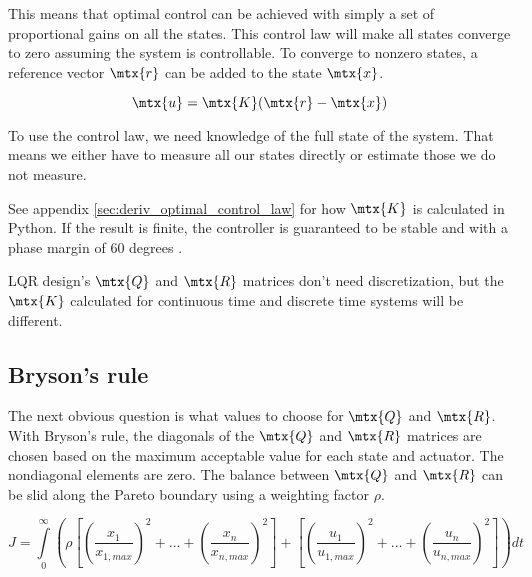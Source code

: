 This means that optimal control can be achieved with simply a set of
proportional gains on all the \glspl{state}. This \gls{control law} will make
all \glspl{state} converge to zero assuming the \gls{system} is controllable. To
converge to nonzero \glspl{state}, a \gls{reference} vector $\mtx{r}$ can be
added to the \gls{state} $\mtx{x}$.

\begin{theorem}
  \begin{equation}
    \mtx{u} = \mtx{K}(\mtx{r} - \mtx{x})
  \end{equation}
\end{theorem}

To use the \gls{control law}, we need knowledge of the full \gls{state} of the
\gls{system}. That means we either have to measure all our \glspl{state}
directly or estimate those we do not measure.

See appendix \ref{sec:deriv_optimal_control_law} for how $\mtx{K}$ is calculated
in Python. If the result is finite, the controller is guaranteed to be stable
and  with a \gls{phase margin} of 60 degrees
\cite{bib:lqr_phase_margin}.

\begin{remark}
  LQR design's $\mtx{Q}$ and $\mtx{R}$ matrices don't need \gls{discretization},
  but the $\mtx{K}$ calculated for continuous time and discrete time
  \glspl{system} will be different.
\end{remark}

\subsection{Bryson's rule}

The next obvious question is what values to choose for $\mtx{Q}$ and $\mtx{R}$.
With Bryson's rule, the diagonals of the $\mtx{Q}$ and $\mtx{R}$ matrices are
chosen based on the maximum acceptable value for each \gls{state} and actuator.
The nondiagonal elements are zero. The balance between $\mtx{Q}$ and $\mtx{R}$
can be slid along the Pareto boundary using a weighting factor $\rho$.

\begin{equation*}
  J = \int\limits_0^\infty \left(\rho \left[
    \left(\frac{x_1}{x_{1,max}}\right)^2 + \ldots +
    \left(\frac{x_n}{x_{n,max}}\right)^2\right] + \left[
    \left(\frac{u_1}{u_{1,max}}\right)^2 + \ldots +
    \left(\frac{u_n}{u_{n,max}}\right)^2\right]\right) dt
\end{equation*}

